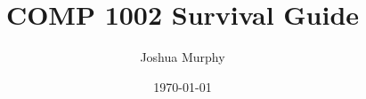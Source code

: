 \documentclass[titlepage]{article}
\title{COMP 1002 Survival Guide}
\author{Joshua Murphy}
\date{\today}
\begin{document}
\maketitle
\tableofcontents{}
\pagebreak






% 

\printglossaries
\end{document}
